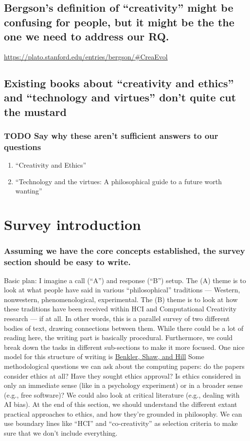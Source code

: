 \documentclass[11pt]{article}
\begin{document}
\subsection{Bergson’s definition of ``creativity'' might be confusing for people, but it might be the the one we need to address our RQ.}
\label{sec:orgd72aad0}
\url{https://plato.stanford.edu/entries/bergson/\#CreaEvol}
\subsection{Existing books about “creativity and ethics” and ``technology and virtues'' don’t quite cut the mustard}
\label{sec:org820cec5}
\subsubsection{{\bfseries\sffamily TODO} Say why these aren’t sufficient answers to our questions}
\label{sec:org21e304b}
\begin{enumerate}
\item ``Creativity and Ethics''
\label{sec:org51dfd37}
\item ``Technology and the virtues: A philosophical guide to a future worth wanting''
\label{sec:org4abc9ba}
\end{enumerate}

\section{Survey introduction}
\label{sec:org6c6ca17}
\subsubsection{Assuming we have the core concepts established, the survey section should be easy to write.}
\label{sec:orgb916ad8}
Basic plan: I imagine a call (``A'') and response (``B'') setup. The (A)
theme is to look at what people have said in various ``philosophical''
traditions — Western, nonwestern, phenomenological, experimental. The
(B) theme is to look at how these traditions have been received within
HCI and Computational Creativity research — if at all. In other words,
this is a parallel survey of two different bodies of text, drawing
connections between them. While there could be a lot of reading here,
the writing part is basically procedural.  Furthermore, we could break
down the tasks in different sub-sections to make it more focused. One
nice model for this structure of writing is \href{https://mako.cc/benkler\_shaw\_hill-peer\_production\_ci.pdf}{Benkler, Shaw, and Hill}
Some methodological questions we can ask about the computing papers:
do the papers consider ethics at all? Have they sought ethics
approval?  Is ethics considered in only an immediate sense (like in a
psychology experiment) or in a broader sense (e.g., free software)? We
could also look at critical literature (e.g., dealing with AI
bias). At the end of this section, we should understand the different
extant practical approaches to ethics, and how they’re grounded in
philosophy. We can use boundary lines like “HCI” and “co-creativity”
as selection criteria to make sure that we don’t include everything.
\end{document}
